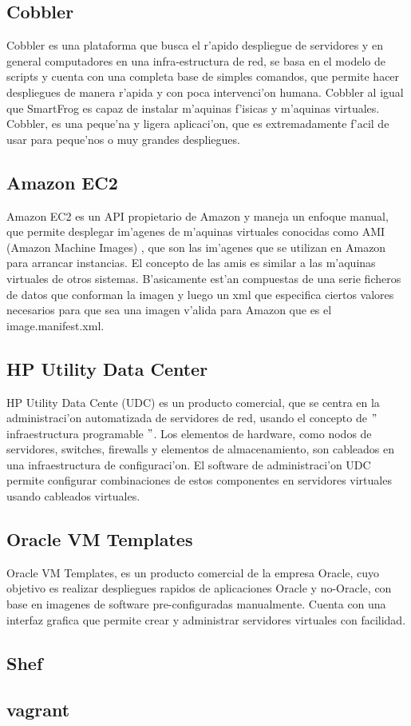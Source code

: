 \subsection{Cobbler}
Cobbler es una plataforma que busca el r'apido despliegue de servidores y en general computadores en una infra-estructura de red, se basa en el modelo de scripts y cuenta con una completa base de simples comandos, que permite hacer despliegues de manera r'apida y con poca intervenci'on humana. Cobbler al igual que SmartFrog es capaz de instalar m'aquinas f'isicas y m'aquinas virtuales. Cobbler, es una peque'na y ligera aplicaci'on, que es extremadamente f'acil de usar para peque'nos o muy grandes despliegues. \cite{6}

\subsection{Amazon EC2}
Amazon EC2 es un API propietario de Amazon y maneja un enfoque manual, que permite desplegar im'agenes de m'aquinas virtuales conocidas como AMI (Amazon Machine Images) \cite{9}, que son las im'agenes que se utilizan en Amazon para arrancar instancias. El concepto de las amis es similar a las m'aquinas virtuales de otros sistemas. B'asicamente est'an compuestas de una serie ficheros de datos que conforman la imagen y luego un xml que especifica ciertos valores necesarios para que sea una imagen v'alida para Amazon que es el image.manifest.xml. 

\subsection{HP Utility Data Center}
HP Utility Data Cente (UDC) es un producto comercial, que se centra en la administraci'on automatizada de servidores de red, usando el concepto de $"$infraestructura programable $"$. Los elementos de hardware, como nodos de servidores, switches, firewalls y elementos de almacenamiento, son cableados en una infraestructura de configuraci'on. El software de administraci'on UDC permite configurar combinaciones de estos componentes en servidores virtuales usando cableados virtuales. \cite{15}

\subsection{Oracle VM Templates}
Oracle VM Templates, es un producto comercial de la empresa Oracle, cuyo objetivo es realizar despliegues rapidos de aplicaciones Oracle y no-Oracle, con base en imagenes de software pre-configuradas manualmente. Cuenta con una interfaz grafica que permite crear y administrar servidores virtuales con facilidad. \cite{14}

\subsection{Shef}
\subsection{vagrant}


